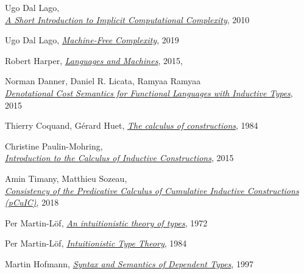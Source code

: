 \documentclass[declaration,mgr,english,shortabstract]{iithesis}
\begin{document}
\begin{thebibliography}{1}
    Ugo Dal Lago, \\
    \href{http://cs.unibo.it/~dallago/FICQRA/esslli.pdf}{\textit{A Short Introduction to Implicit Computational Complexity}},
    2010

    Ugo Dal Lago,
    \href{https://caleidoscope.sciencesconf.org/data/DalLago_caleidoscopeslides.pdf}{\textit{Machine-Free Complexity}},
    2019

    Robert Harper,
    \href{https://existentialtype.wordpress.com/2011/03/16/languages-and-machines/}{\textit{Languages and Machines}},
    2015, \\

    Norman Danner, Daniel R. Licata, Ramyaa Ramyaa \\
    \href{https://dlicata.wescreates.wesleyan.edu/pubs/dlr15inductive/dlr15inductive.pdf}{\textit{Denotational Cost Semantics for Functional Languages with Inductive Types}},
    2015

    Thierry Coquand, Gérard Huet,
    \href{https://www.sciencedirect.com/science/article/pii/0890540188900053}{\textit{The calculus of constructions}},
    1984

    Christine Paulin-Mohring, \\
    \href{https://hal.inria.fr/hal-01094195/document}{\textit{Introduction to the Calculus of Inductive Constructions}},
    2015

    Amin Timany, Matthieu Sozeau, \\
    \href{https://hal.inria.fr/hal-01615123v2/document}{\textit{Consistency of the Predicative Calculus of Cumulative Inductive Constructions (pCuIC)}},
    2018

    Per Martin-L\"{o}f,
    \href{https://archive-pml.github.io/martin-lof/pdfs/An-Intuitionistic-Theory-of-Types-1972.pdf}{\textit{An intuitionistic theory of types}}, 1972

    Per Martin-L\"{o}f,
    \href{https://archive-pml.github.io/martin-lof/pdfs/Bibliopolis-Book-retypeset-1984.pdf}{\textit{Intuitionistic Type Theory}},
    1984

    Martin Hofmann,
    \href{https://www.tcs.ifi.lmu.de/mitarbeiter/martin-hofmann/pdfs/syntaxandsemanticsof-dependenttypes.pdf}{\textit{Syntax and Semantics of Dependent
    Types}},
    1997


\end{thebibliography}
\end{document}
